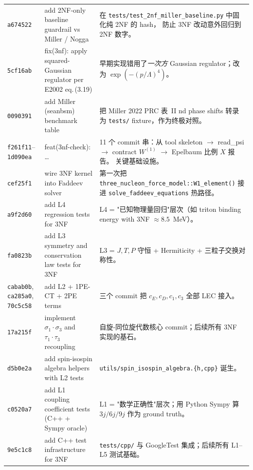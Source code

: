 \begin{longtable}{@{}p{16mm}p{52mm}p{72mm}@{}}
\texttt{a674522} & add 2NF-only baseline guardrail vs Miller / Nogga
& 在 \texttt{tests/test\_2nf\_miller\_baseline.py} 中固化纯 2NF 的 hash，
  防止 3NF 改动意外回归到 2NF 数字。\\

\texttt{5cf16ab} & fix(3nf): apply squared-Gaussian regulator per E2002 eq.\,(3.19)
& 早期实现错用了\emph{一次方} Gaussian regulator；改为 $\exp(-(p/\Lambda)^4)$。\\

\texttt{0090391} & add Miller (seanbsm) benchmark table
& 把 Miller 2022 PRC 表~II nd phase shifts 转录为 \texttt{tests/}
  fixture，作为终极对照。\\

\texttt{f261f11}--\texttt{1d090ea} & feat(3nf-check): \ldots
& 11 个 commit 串：从 tool skeleton $\to$ read\_psi $\to$
  contract $W^{(1)}$ $\to$ Epelbaum 比例 $X$ 报告。
  关键基础设施。\\

\texttt{cef25f1} & wire 3NF kernel into Faddeev solver
& 第一次把 \texttt{three\_nucleon\_force\_model::W1\_element()} 接进
  \texttt{solve\_faddeev\_equations} 热路径。\\

\texttt{a9f2d60} & add L4 regression tests for 3NF
& L4 = "已知物理量回归"层次（如 triton binding energy with 3NF $\approx 8.5$~MeV）。\\

\texttt{fa0823b} & add L3 symmetry and conservation law tests for 3NF
& L3 = $J,T,P$ 守恒 + Hermiticity + 三粒子交换对称性。\\

\texttt{cabab0b}, \texttt{ca285a0}, \texttt{70c5c58} & add L2 + 1PE-CT + 2PE terms
& 三个 commit 把 $c_E, c_D, c_1, c_3$ 全部 LEC 接入。\\

\texttt{17a215f} & implement $\sigma_1\!\cdot\!\sigma_3$ and $\tau_1\!\cdot\!\tau_3$ recoupling
& 自旋-同位旋代数核心 commit；后续所有 3NF 实现的基石。\\

\texttt{d5b0e2a} & add spin-isospin algebra helpers with L2 tests
& \texttt{utils/spin\_isospin\_algebra.\{h,cpp\}} 诞生。\\

\texttt{c0520a7} & add L1 coupling coefficient tests (C++ + Sympy oracle)
& L1 = "数学正确性"层次；用 Python Sympy 算 $3j/6j/9j$ 作为 ground truth。\\

\texttt{9e5c1c8} & add C++ test infrastructure for 3NF
& \texttt{tests/cpp/} 与 GoogleTest 集成；后续所有 L1--L5 测试基础。\\


\end{longtable}
